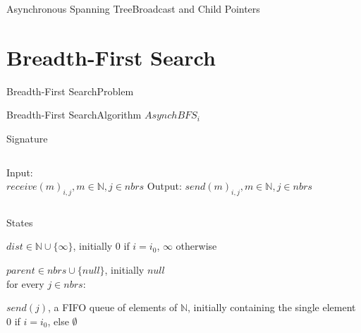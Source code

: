 \documentclass[pdf]{beamer}
\begin{document}
\begin{frame}{Asynchronous Spanning Tree}{Broadcast and Child Pointers}
	
	
\end{frame}

\section{Breadth-First Search}
\begin{frame}{Breadth-First Search}{Problem}
	
	
\end{frame}

\begin{frame}{Breadth-First Search}{Algorithm}
	$AsynchBFS_i$
    \begin{block}{Signature}
        \begin{columns}
            Input:\\
            \hspace*{\parindent} $receive(m)_{i,j}, m \in \mathbb{N}, j \in nbrs$
            Output:
            \hspace*{\parindent} $send(m)_{i,j}, m \in \mathbb{N}, j \in nbrs$
        \end{columns}
    \end{block}
    \begin{block}{States}
        \begin{tcolorbox}[height=0.8cm,colframe=red]
        $dist \in \mathbb{N} \cup \{\infty\}$, initially $0$ if $i=i_0$, $\infty $ otherwise\\
        \end{tcolorbox}
        $parent \in nbrs \cup \{null\}$, initially $null$\\
        for every $j \in nbrs$:\\
        \hspace*{\parindent}
        \parbox{\textwidth}{$send(j)$,
        a FIFO queue of elements of $\mathbb{N}$,
        initially containing the single element $0$ if $i=i_0$, else $\emptyset$}
    \end{block}
	
\end{frame}
\end{document}
